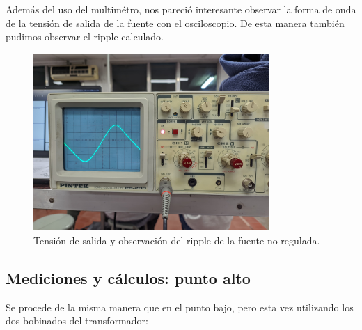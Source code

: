 \documentclass[chaptersright]{informeutn}
\begin{document}
        Además del uso del multimétro, nos pareció interesante observar la forma de onda de la tensión de salida de la
        fuente con el osciloscopio. De esta manera también pudimos observar el ripple calculado.
        \begin{figure}[!h]
          \centering
          \includegraphics[width=0.8\textwidth]{pictures/ripple_fuente-nreg.jpeg}
          \caption{Tensión de salida y observación del ripple de la fuente no regulada.}
        \end{figure}

        \subsection{Mediciones y cálculos: punto alto}
            Se procede de la misma manera que en el punto bajo, pero esta vez utilizando los dos bobinados del
            transformador:
\end{document}
